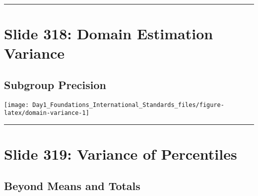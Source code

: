 \documentclass[
]{article}
\begin{document}
\begin{center}\rule{0.5\linewidth}{0.5pt}\end{center}

\section{Slide 318: Domain Estimation
Variance}\label{slide-318-domain-estimation-variance}

\subsection{Subgroup Precision}\label{subgroup-precision}

\texttt{[image: Day1\_Foundations\_International\_Standards\_files/figure-latex/domain-variance-1]}

\begin{center}\rule{0.5\linewidth}{0.5pt}\end{center}

\section{Slide 319: Variance of
Percentiles}\label{slide-319-variance-of-percentiles}

\subsection{Beyond Means and Totals}\label{beyond-means-and-totals}
\end{document}
